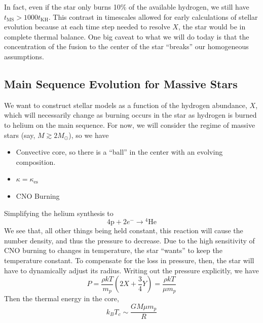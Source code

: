 \documentclass[10pt]{article}
\numberwithin{equation}{section}
\newcommand{\n}{\noindent}
\begin{document}
    \n In fact, even if the star only burns 10\% of the available
    hydrogen, we still have $t_{\mathrm{MS}}>1000
    t_{\mathrm{KH}}$. This contrast in timescales allowed for early
    calculations of stellar evolution because at each time step needed
    to resolve $X$, the star would be in complete thermal balance. One
    big caveat to what we will do today is that the concentration of
    the fusion to the center of the star ``breaks'' our homogeneous
    assumptions.

    \subsection{Main Sequence Evolution for Massive Stars}
    \label{sec:main-sequ-evol}

    We want to construct stellar models as a function of the hydrogen
    abundance, $X$, which will necessarily change as burning occurs in
    the star as hydrogen is burned to helium on the main sequence. For
    now, we will consider the regime of massive stars (say, $M\gtrsim 2M_\odot$),
    so we have
    \begin{itemize}
    \item Convective core, so there is a ``ball'' in the center with
      an evolving composition.
    \item $\kappa=\kappa_{\mathrm{es}}$
    \item CNO Burning
    \end{itemize}
    Simplifying the helium synthesis to
    \begin{equation}
      \label{eq:227}
      4\mathrm{p}+2e^-\to {}^4\mathrm{He}
    \end{equation}
    We see that, all other things being held constant, this reaction
    will cause the number density, and thus the pressure to
    decrease. Due to the high sensitivity of CNO burning to changes in
    temperature, the star ``wants'' to keep the temperature
    constant. To compensate for the loss in pressure, then, the star
    will have to dynamically adjust its radius. Writing out the
    pressure explicitly, we have
    \begin{equation}
      \label{eq:228}
      P=\frac{\rho kT}{m_p}\left(2X+\frac{3}{4}Y\right)=\frac{\rho
        kT}{\mu m_p}
    \end{equation}
    Then the thermal energy in the core,
    \begin{equation}
      \label{eq:229}
      k_B T_c\sim\frac{GM\mu m_p}{R}
    \end{equation}
\end{document}
